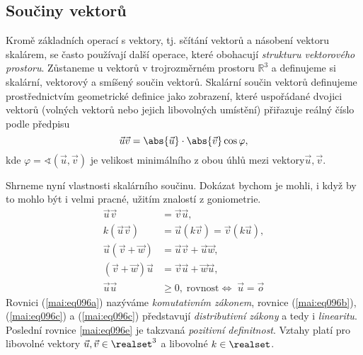     \subsection{Součiny vektorů}\label{mai:IchapIIsecIVsubIII}
      Kromě základních operací s vektory, tj. sčítání vektorů a násobení vektoru skalárem, se 
      často používají další operace, které obohacují \emph{strukturu vektorového prostoru}. 
      Zůstaneme u vektorů v trojrozměrném prostoru \(\mathbb{R}^3\) a definujeme si skalární, 
      vektorový a smíšený součin vektorů. Skalární součin vektorů definujeme prostřednictvím 
      geometrické definice jako zobrazení, které uspořádané dvojici vektorů (volných vektorů nebo 
      jejich libovolných umístění) přiřazuje reálný číslo podle předpisu
      \begin{equation}\label{mai:eq038}
        \vec{u}\vec{v} = \abs{\vec{u}}\cdot\abs{\vec{v}}\cos\varphi,
      \end{equation}
      kde \(\varphi = \sphericalangle(\vec{u},\vec{v})\) je velikost minimálního z obou úhlů mezi 
      vektory\(\vec{u},\vec{v}\).

        
      
      Shrneme nyní vlastnosti skalárního součinu. Dokázat bychom je mohli, i když by to mohlo být i 
      velmi pracné, užitím znalostí z goniometrie.
      \begin{subequations}\label{mai:eq096}
        \begin{align}
          \vec{u}\vec{v}    &= \vec{v}\vec{u},                                  \label{mai:eq096a}\\
          k(\vec{u}\vec{v}) &= \vec{u}(k\vec{v}) = \vec{v}(k\vec{u}),           \label{mai:eq096b}\\
          \vec{u}(\vec{v} + \vec{w}) &= \vec{u}\vec{v} + \vec{u}\vec{w},        \label{mai:eq096c}\\
          (\vec{v} + \vec{w})\vec{u} &= \vec{v}\vec{u} + \vec{w}\vec{u},        \label{mai:eq096d}\\
          \vec{u}\vec{u}&\geq 0,\;\text{rovnost}\Leftrightarrow\;\vec{u}=\vec{o}\label{mai:eq096e}        
        \end{align}
      \end{subequations}
      Rovnici (\ref{mai:eq096a}) nazýváme \emph{komutativním zákonem}, rovnice (\ref{mai:eq096b}),
      (\ref{mai:eq096c}) a (\ref{mai:eq096c}) představují \emph{distributivní zákony} a tedy i
      \emph{linearitu}. Poslední rovnice \ref{mai:eq096e} je takzvaná \emph{pozitivní definitnost}.
      Vztahy platí pro libovolné vektory \( \vec{u},\vec{v}\in\realset^3\) a libovolné \(k \in
      \realset\).

